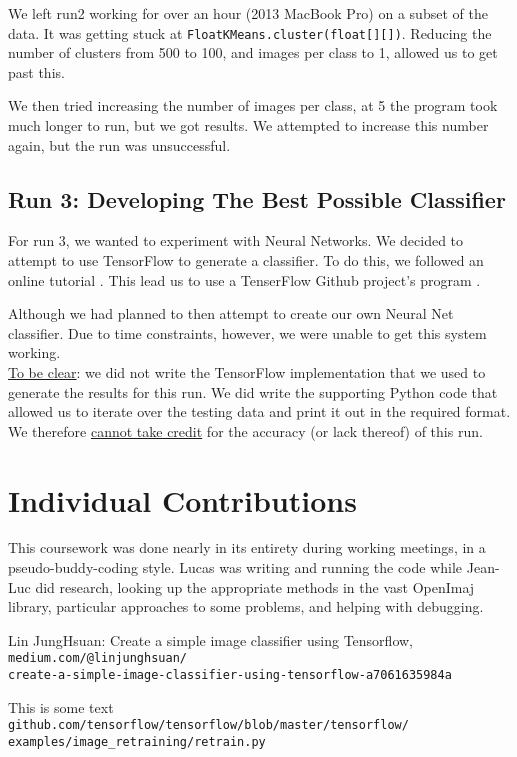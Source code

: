 \documentclass[a4paper,12pt]{article}
\begin{document}
We left run2 working for over an hour (2013 MacBook Pro) on a subset of the data. It was getting stuck at \texttt{FloatKMeans.cluster(float[][])}. Reducing the number of clusters from 500 to 100, and images per class to 1, allowed us to get past this.

We then tried increasing the number of images per class, at 5 the program took much longer to run, but we got results. We attempted to increase this number again, but the run was unsuccessful.

\subsection{Run 3: Developing The Best Possible Classifier}

For run 3, we wanted to experiment with Neural Networks. We decided to attempt to use TensorFlow to generate a classifier. To do this, we followed an online tutorial \cite{tutorial}. This lead us to use a TenserFlow Github project's program \cite{git}.

Although we had planned to then attempt to create our own Neural Net classifier. Due to time constraints, however, we were unable to get this system working.\\


\underline{To be clear}: we did not write the TensorFlow implementation that we used to generate the results for this run. We did write the supporting Python code that allowed us to iterate over the testing data and print it out in the required format. We therefore \underline{cannot take credit} for the accuracy (or lack thereof) of this run.

\section{Individual Contributions}
This coursework was done nearly in its entirety during working meetings, in a pseudo-buddy-coding style. Lucas was writing and running the code while Jean-Luc did research, looking up the appropriate methods in the vast OpenImaj library, particular approaches to some problems, and helping with debugging.

\begin{thebibliography}{9}
Lin JungHsuan: Create a simple image classifier using Tensorflow,
\\\texttt{medium.com/@linjunghsuan/ \\
create-a-simple-image-classifier-using-tensorflow-a7061635984a}

This is some text
\texttt{github.com/tensorflow/tensorflow/blob/master/tensorflow/ \\
examples/image\_retraining/retrain.py}
\end{thebibliography}
\end{document}

